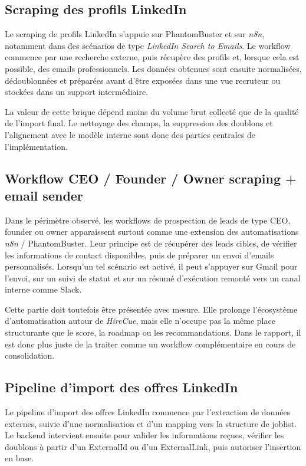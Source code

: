 \subsection{Scraping des profils LinkedIn}

Le scraping de profils LinkedIn s'appuie sur PhantomBuster et sur \textit{n8n}, notamment dans des scénarios de type \textit{LinkedIn Search to Emails}. Le workflow commence par une recherche externe, puis récupère des profils et, lorsque cela est possible, des emails professionnels. Les données obtenues sont ensuite normalisées, dédoublonnées et préparées avant d'être exposées dans une vue recruteur ou stockées dans un support intermédiaire.

La valeur de cette brique dépend moins du volume brut collecté que de la qualité de l'import final. Le nettoyage des champs, la suppression des doublons et l'alignement avec le modèle interne sont donc des parties centrales de l'implémentation.

\subsection{Workflow CEO / Founder / Owner scraping + email sender}

Dans le périmètre observé, les workflows de prospection de leads de type CEO, founder ou owner apparaissent surtout comme une extension des automatisations \textit{n8n} / PhantomBuster. Leur principe est de récupérer des leads cibles, de vérifier les informations de contact disponibles, puis de préparer un envoi d'emails personnalisés. Lorsqu'un tel scénario est activé, il peut s'appuyer sur Gmail pour l'envoi, sur un suivi de statut et sur un résumé d'exécution remonté vers un canal interne comme Slack.

Cette partie doit toutefois être présentée avec mesure. Elle prolonge l'écosystème d'automatisation autour de \textit{HireCue}, mais elle n'occupe pas la même place structurante que le score, la roadmap ou les recommandations. Dans le rapport, il est donc plus juste de la traiter comme un workflow complémentaire en cours de consolidation.

\subsection{Pipeline d'import des offres LinkedIn}

Le pipeline d'import des offres LinkedIn commence par l'extraction de données externes, suivie d'une normalisation et d'un mapping vers la structure de joblist. Le backend intervient ensuite pour valider les informations reçues, vérifier les doublons à partir d'un ExternalId ou d'un ExternalLink, puis autoriser l'insertion en base.

